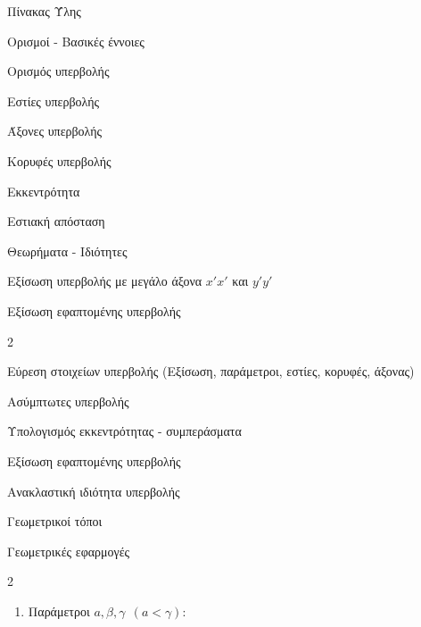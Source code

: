 \documentclass[twoside,nofonts,internet,math,spyros]{frontisthrio}
\newcommand{\myitem}{\stepcounter{enumi}\item[\raisebox{0.5mm}{\faEdit}\ \Large$\square$]}
\begin{document}
\begin{mybox}[mysubtitle]{Πίνακας Ύλης}
\begin{tcbraster}[raster columns=2,raster equal height]
\begin{myleftbox}{Ορισμοί - Βασικές έννοιες\ \ \faBook}
\begin{arithmisi}[itemsep=0mm]
\item Ορισμός υπερβολής
\item Εστίες υπερβολής
\item Άξονες υπερβολής
\item Κορυφές υπερβολής
\item Εκκεντρότητα
\item Εστιακή απόσταση
\end{arithmisi}
\end{myleftbox}
\begin{myrightbox}{Θεωρήματα - Ιδιότητες\ \ \faTools}
\begin{arithmisi}[itemsep=0mm]
\item Εξίσωση υπερβολής με μεγάλο άξονα $x'x'$ και $y'y'$
\item Εξίσωση εφαπτομένης υπερβολής
\end{arithmisi}
\end{myrightbox}
\end{tcbraster}
\begin{multicols}{2}
\begin{todolist}[itemsep=0mm]
\myitem Εύρεση στοιχείων υπερβολής (Εξίσωση, παράμετροι, εστίες, κορυφές, άξονας)
\item Ασύμπτωτες υπερβολής
\item Υπολογισμός εκκεντρότητας - συμπεράσματα
\item Εξίσωση εφαπτομένης υπερβολής
\item Ανακλαστική ιδιότητα υπερβολής
\item Γεωμετρικοί τόποι
\item Γεωμετρικές εφαρμογές
\end{todolist}
\end{multicols}
\begin{multicols*}{2}
\begin{enumerate}[itemsep=0mm,leftmargin=5mm]
\item Παράμετροι $ a,\beta,\gamma\ \ (a<\gamma) $:
\end{enumerate}
\end{multicols*}
\end{mybox}
\end{document}
